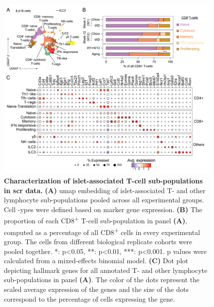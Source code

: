 \begin{figure}[t!]
\centering
\includegraphics[width=\linewidth]{Chapter4/Fig/F2-10-01.png}
\caption[Characterization of T-cell sub-populations in  data]{\textbf{Characterization of islet-associated T-cell sub-populations in \gls{scr} data.} \textbf{(A)} \gls{umap} embedding of islet-associated T- and other lymphocyte sub-populations pooled across all experimental groups. Cell -ypes were defined based on marker gene expression. \textbf{(B)} The proportion of each CD8\textsuperscript{+} T-cell sub-population in panel \textbf{(A)}, computed as a percentage of all CD8\textsuperscript{+} cells in every experimental group. The cells from different biological replicate cohorts were pooled together. *: p<0.05, **: p<0.01, ***: p<0.001. p values were calculated from a mixed-effects binomial model. \textbf{(C)} Dot plot depicting hallmark genes for all annotated T- and other lymphocyte sub-populations in panel \textbf{(A)}. The color of the dots represent the scaled average expression of the genes and the size of the dots correspond to the percentage of cells expressing the gene.
}
\label{fig:chp2_scrna_tcells1}
\end{figure}

